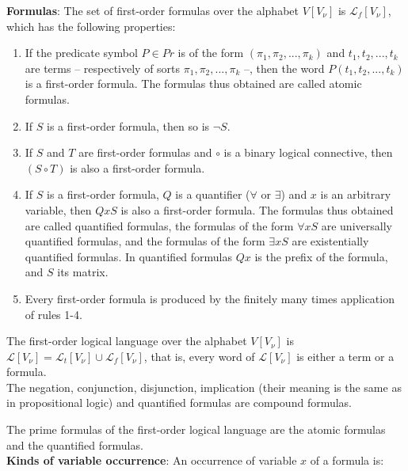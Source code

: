 \documentclass[margin=0px]{article}
\begin{document}
\noindent \textbf{Formulas}: The set of first-order formulas over the alphabet $V[V_{\nu}]$ is $\mathcal{L}_{f}[V_{\nu}]$, which
has the following properties:

\begin{enumerate}
    \item	If the predicate symbol $P \in Pr$ is of the form $(\pi_{1}, \pi_{2}, ..., \pi_{k})$
          and $t_{1}, t_{2}, ..., t_{k}$ are terms -- respectively of sorts $\pi_{1}, \pi_{2}, ..., \pi_{k}$ --,
          then the word $P(t_{1}, t_{2}, ..., t_{k})$ is a first-order formula.
          The formulas thus obtained are called atomic formulas.

    \item	If $S$ is a first-order formula, then so is $\neg S$.

    \item	If $S$ and $T$ are first-order formulas and $\circ$ is a binary logical connective,
          then $(S \circ T)$ is also a first-order formula.

    \item	If $S$ is a first-order formula, $Q$ is a quantifier ($\forall$ or $\exists$) and $x$
          is an arbitrary variable, then $QxS$ is also a first-order formula. The formulas thus obtained are called quantified formulas,
          the formulas of the form $\forall xS$ are universally quantified formulas, and the formulas of the form $\exists xS$
          are existentially quantified formulas. In quantified formulas $Qx$ is the prefix of the formula, and $S$
          its matrix.

    \item	Every first-order formula is produced by the finitely many times application of rules 1-4.
\end{enumerate}

\noindent The first-order logical language over the alphabet $V[V_{\nu}]$ is
$\mathcal{L}[V_{\nu}] = \mathcal{L}_{t}[V_{\nu}] \cup \mathcal{L}_{f}[V_{\nu}]$, that is, every word of $\mathcal{L}[V_{\nu}]$
is either a term or a formula.\\

The negation, conjunction, disjunction, implication (their meaning is the same as in propositional logic) and quantified formulas
are compound formulas.

The prime formulas of the first-order logical language are the atomic formulas and the quantified formulas.\\

\noindent \textbf{Kinds of variable occurrence}: An occurrence of variable $x$ of a formula is:
\end{document}
